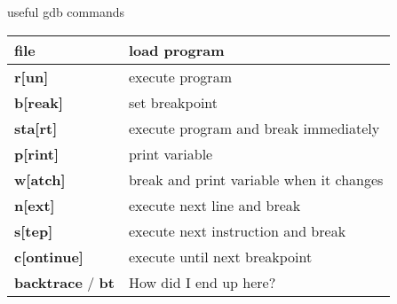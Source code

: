 \documentclass[10pt,graphics,aspectratio=169,table]{beamer}
\begin{document}
\begin{frame}{useful gdb commands}
    \begin{tabular}{|l|l|}
        \hline
        \textbf{file} & load program\\\hline
        \textbf{r[un]} & execute program\\\hline
        \textbf{b[reak]} & set breakpoint\\\hline
        \textbf{sta[rt]} & execute program and break immediately\\\hline
        \textbf{p[rint]} & print variable\\\hline
        \textbf{w[atch]} & break and print variable when it changes\\\hline
        \textbf{n[ext]} & execute next line and break\\\hline
        \textbf{s[tep]} & execute next instruction and break\\\hline
        \textbf{c[ontinue]} & execute until next breakpoint\\\hline
        \textbf{backtrace} / \textbf{bt} & How did I end up here?\\\hline
    \end{tabular}
\end{frame}
\end{document}
